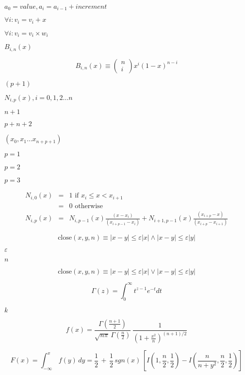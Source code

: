 \documentclass{article}
\begin{document}
$ a_{0} = value, a_{i}=a_{i-1}+increment $
\pagebreak

$ \forall i : v_i = v_i + x $
\pagebreak

$ \forall i : v_i = v_i \times w_i $
\pagebreak

$  B_{i,n}(x) $
\pagebreak

\[B_{i,n}(x) \equiv \left( \begin{array}{c} n \\ i \end{array} \right)
x^i (1-x)^{n-i}
\]
\pagebreak

$ (p+1) $
\pagebreak

$ N_{i,p}(x), i = 0,1,2 \ldots n $
\pagebreak

$ n+1 $
\pagebreak

$ p+n+2 $
\pagebreak

$ (x_0, x_1 \ldots x_{n+p+1}) $
\pagebreak

$ p=1 $
\pagebreak

$ p=2 $
\pagebreak

$ p=3 $
\pagebreak

\[\begin{array}{rcl}
N_{i,0}(x) &=& 1   \textrm{\ if\ } x_{i} \leq x < x_{i+1} \\
           &=& 0   \textrm{\ otherwise} \\
N_{i,p}(x) &=& N_{i,p-1}(x) \frac{(x - x_{i})}{ (x_{i+p-1} - x_{i})} +
               N_{i+1,p-1}(x) \frac{(x_{i+p} - x)}{(x_{i+p} - x_{i+1})}
\end{array}
\]
\pagebreak

\[\mathrm{close}(x,y,n) \equiv |x-y| \leq \varepsilon |x|
                      \wedge |x-y| \leq \varepsilon |y|
\]
\pagebreak

$ \varepsilon $
\pagebreak

$ n $
\pagebreak

\[\mathrm{close}(x,y,n) \equiv |x-y| \leq \varepsilon |x|
                        \vee |x-y| \leq \varepsilon |y|
\]
\pagebreak

\[    \Gamma(z) = \int_0^{\infty}t^{z-1}e^{-t}dt
\]
\pagebreak

$ k $
\pagebreak

\[f(x) = \frac {\Gamma\left(\frac{n+1}{2}\right)} {\sqrt{n\pi}
\, \Gamma\left(\frac{n}{2}\right)}\:
\frac {1} {\left(1+\frac{x^2}{n}\right)^{(n+1)/2}}
\]
\pagebreak

\[F(x) = \int_{-\infty}^x\,f(y)\,dy
= \frac{1}{2}\,
+\,\frac{1}{2}\,sgn(x)\,
\left[ I\left(1,\frac{n}{2},\frac{1}{2}\right)
- I\left(\frac{n}{n+y^2}, \frac{n}{2},\frac{1}{2}\right)\right]
\]
\pagebreak
\end{document}
